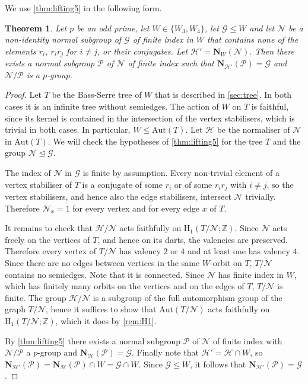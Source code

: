 \documentclass{amsart}
\theoremstyle{plain}
\newtheorem{theorem}{Theorem}[section]
\theoremstyle{definition}
\theoremstyle{remark}
\newcommand{\ZZ}{\mathbb{Z}}
\renewcommand{\P}{\mathcal P}
\newcommand{\N}{\mathcal N}
\renewcommand{\H}{\mathcal H}
\newcommand{\G}{\mathcal G}
\newcommand{\No}{\mathbf N}
\newcommand{\Aut}{\mathrm{Aut}}
\begin{document}
We use \cref{thm:lifting5} in the following form.



\begin{theorem}\label{thm:lifting5'}
Let $p$ be an odd prime, let $W\in \{W_3, W_4\}$, let $\G\le W$ and let $\N$ be a non-identity
normal subgroup of $\G$ of finite index in $W$ that contains none of the
elements $r_i$, $r_ir_j$ for $i \ne j$,
 or their conjugates. 
 Let
$\H'=\No_{W}( \N)$. Then there exists a normal
subgroup $\P$ of $\N$ of finite index such that
$\No_{\H'}(\P)=\G$ and $\N/\P$ is a
$p$-group.
\end{theorem}

\begin{proof}
	Let $T$ be the Bass-Serre tree of $W$ that is described in \cref{sec:tree}. In both cases it
	is an infinite tree without semiedges. The action of $W$ on $T$ is faithful, since its kernel is
	contained in the intersection of the vertex stabilisers, which is trivial in both cases. In particular,
	$W\le\Aut(T)$. Let $\H$ be the
	normaliser of $\N$ in $\Aut(T)$. We will check the hypotheses of \cref{thm:lifting5}
	for the tree $T$ and the group $\N\trianglelefteq\G$.

	The index of $\N$ in $\G$ is finite by assumption. Every non-trivial element of a vertex
	stabiliser of $T$ is a conjugate of some $r_i$ or of some $r_ir_j$ with $i\ne j$, so the
	vertex stabilisers, and hence also the edge stabilisers, intersect $\N$ trivially.
	Therefore $\N_x=1$ for every vertex and for every edge $x$ of $T$.

	It remains to check that $\H / \N$ acts faithfully on
	$\mathrm{H}_1(T/ \N; \ZZ)$. Since $\N$ acts freely on the
	vertices of $T$, and hence on its darts, the valencies are preserved. 
  Therefore every vertex of
	$T/\N$ has valency $2$ or $4$ and at least one has valency $4$.
   Since there are no edges between vertices
   in the same $W$-orbit on $T$, $T/\N$ contains no semiedges. Note that it is connected. 
   Since $\N$ has finite
    index in $W$,
	which has finitely many orbits on the vertices and on the edges of $T$,
	 $T/ \N$ is finite.
	The group $\H/\N$ is a subgroup of the full automorphism group of the
	graph $T/\N$, hence it suffices to show that $\Aut(T/\N)$ acts
	faithfully on $\mathrm{H}_1(T/ \N ; \ZZ)$, which it does by \cref{rem:H1}.

By \cref{thm:lifting5} there exists a normal subgroup $\P$ of $\N$ of
finite index with $\N/\P$ a $p$-group and
$\No_{\H}(\P)=\G$. Finally note that $\H'=\H\cap W$,
so $\No_{\H'}(\P)=\No_{\H}(\P)\cap W
=\G\cap W$. Since $\G\le W$, it follows that $\No_{\H'}(\P) = \G$.
\end{proof}
\end{document}
